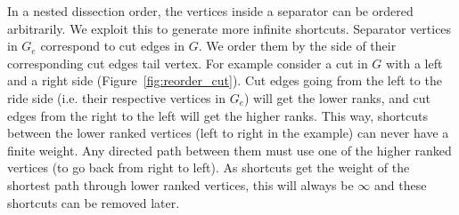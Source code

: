\documentclass[a4paper, english, cleveref]{lipics-v2021}
\begin{document}
In a nested dissection order, the vertices inside a separator can be ordered arbitrarily.
We exploit this to generate more infinite shortcuts.
Separator vertices in $G_e$ correspond to cut edges in $G$.
We order them by the side of their corresponding cut edges tail vertex.
For example consider a cut in $G$ with a left and a right side (Figure~\ref{fig:reorder_cut}).
Cut edges going from the left to the ride side (i.e. their respective vertices in $G_e$) will get the lower ranks, and cut edges from the right to the left will get the higher ranks.
This way, shortcuts between the lower ranked vertices (left to right in the example) can never have a finite weight.
Any directed path between them must use one of the higher ranked vertices (to go back from right to left).
As shortcuts get the weight of the shortest path through lower ranked vertices, this will always be $\infty$ and these shortcuts can be removed later.
\end{document}
